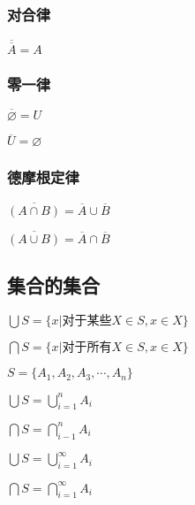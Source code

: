 \documentclass{ctexart}
\begin{document}
\subsubsection{对合律}
$\overline{\overline{A}} = A$
\subsubsection{零一律}
$\overline{\varnothing} = U$

$\overline{U} = \varnothing$
\subsubsection{德摩根定律}
$\overline{(A \cap B)} = \overline{A} \cup \overline{B}$

$\overline{(A \cup B)} = \overline{A} \cap \overline{B}$
\subsection{集合的集合}
$\bigcup S = \{x|\mbox{对于某些}X \in S, x \in X\}$

$\bigcap S = \{x|\mbox{对于所有}X \in S, x \in X\}$

$S = \{A_1, A_2, A_3, \cdots, A_n\}$

$\bigcup{S} = \bigcup\limits_{i=1}^{n} A_i$

$\bigcap{S} = \bigcap\limits_{i-1}^{n} A_i$

$\bigcup{S} = \bigcup\limits_{i=1}^{\infty} A_i$

$\bigcap{S} = \bigcap\limits_{i=1}^{\infty} A_i$
\end{document}
